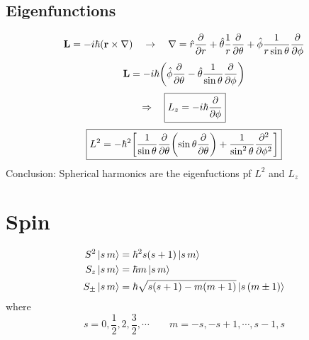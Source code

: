 \subsection{Eigenfunctions}

\[\mathbf{L} = -i\hbar(\mathbf{r}\times\nabla)\quad\rightarrow\quad
  \nabla=\hat{r}\pdv{r}+\hat{\theta}\frac{1}{r}\pdv{\theta}+\hat{\phi}\frac{1}{r\sin\theta}\pdv{\phi}\]
\[\mathbf{L}=-i\hbar\qty(\hat{\phi}\pdv{\theta}-\hat{\theta}\frac{1}{\sin\theta}\pdv{\phi})\]
\[\Rightarrow\quad\boxed{L_z = -i\hbar\pdv{\phi}}\]
\[\boxed{L^2 = -\hbar^2\qty[ \frac{1}{\sin\theta}\pdv{\theta}(\sin\theta\pdv{\theta})
         + \frac{1}{\sin^2\theta}\pdv[2]{\phi} ]}\]
Conclusion: Spherical harmonics are the eigenfuctions pf \(L^2\) and \(L_z\)

\section{Spin}
\[ \begin{aligned}
       S^2\ket{s\,m} &=\hbar^2s(s+1)\ket{s\,m} \\
       S_z\ket{s\,m} &= \hbar m\ket{s\,m} \\
       S_\pm\ket{s\,m} & = \hbar\sqrt{s(s+1)-m(m+1)}\ket{s\,(m\pm 1)}
\end{aligned}\]
where \[s = 0,\frac{1}{2},2,\frac{3}{2},\cdots\qquad m=-s,-s+1,\cdots,s-1,s\]

